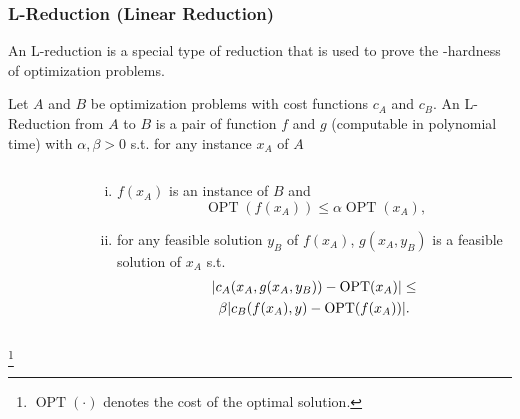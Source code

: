 \documentclass{beamer} %
\DeclarePairedDelimiter\abs{\lvert}{\rvert}%
\newcommand\blfootnote[1]{%
  \begingroup
  \renewcommand\thefootnote{}\footnote{#1}%
  \addtocounter{footnote}{-1}%
  \endgroup
}
\begin{document}
\begin{frame}
  \frametitle{L-Reduction (Linear Reduction)}

  An L-reduction is a special type of reduction that is used to prove the \maxSNP{}-hardness of optimization problems.

  \pause
  \begin{definition}
    Let $A$ and $B$ be optimization problems with cost functions $c_A$ and $c_B$.
    An L-Reduction from $A$ to $B$ is a pair of function $f$ and $g$ (computable in polynomial time) with $\alpha,\beta > 0$ s.t. for any instance $x_A$ of $A$
    \begin{columns}[T] %
      \begin{column}{.35\textwidth}
        \begin{figure}
          \begin{center}
            
          \end{center}
        \end{figure}
      \end{column}%
      \hfill%
      \begin{column}{.6\textwidth}
        \begin{minipage}[c][.5\textheight][c]{\linewidth}
          {\small\begin{enumerate}[(i)]
              \item $f(x_A)$ is an instance of $B$ and
                    \begin{equation*}\operatorname{OPT}(f(x_A))\leq\alpha\operatorname{OPT}(x_A)\text{,}\end{equation*}
              \item for any feasible solution $y_B$ of $f(x_A)$, $g(x_A,y_B)$ is a feasible solution of $x_A$ s.t.
                    \begin{multline*}
                      \abs{c_A(x_A,g(x_A,y_B))-\operatorname{OPT}(x_A)}\leq\\\beta\abs{c_B(f(x_A),y)-\operatorname{OPT}(f(x_A))}\text{.}
                    \end{multline*}
            \end{enumerate}}
        \end{minipage}
      \end{column}%
    \end{columns}
  \end{definition}

  \blfootnote{$\operatorname{OPT}(\cdot)$ denotes the cost of the optimal solution.}
\end{frame}
\end{document}
